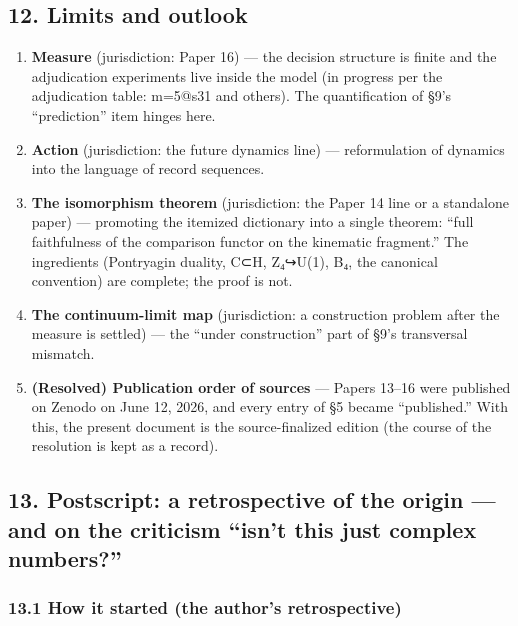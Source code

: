 \documentclass[
]{article}
\providecommand{\tightlist}{%
  \setlength{\itemsep}{0pt}\setlength{\parskip}{0pt}}
\begin{document}
\subsection{12. Limits and outlook}\label{limits-and-outlook}

\begin{enumerate}
\def\labelenumi{\arabic{enumi}.}
\tightlist
\item
  \textbf{Measure} (jurisdiction: Paper 16) --- the decision structure
  is finite and the adjudication experiments live inside the model (in
  progress per the adjudication table: m=5@s31 and others). The
  quantification of §9's ``prediction'' item hinges here.
\item
  \textbf{Action} (jurisdiction: the future dynamics line) ---
  reformulation of dynamics into the language of record sequences.
\item
  \textbf{The isomorphism theorem} (jurisdiction: the Paper 14 line or a
  standalone paper) --- promoting the itemized dictionary into a single
  theorem: ``full faithfulness of the comparison functor on the
  kinematic fragment.'' The ingredients (Pontryagin duality, C⊂H,
  Z₄↪U(1), B₄, the canonical convention) are complete; the proof is not.
\item
  \textbf{The continuum-limit map} (jurisdiction: a construction problem
  after the measure is settled) --- the ``under construction'' part of
  §9's transversal mismatch.
\item
  \textbf{(Resolved) Publication order of sources} --- Papers 13--16
  were published on Zenodo on June 12, 2026, and every entry of §5
  became ``published.'' With this, the present document is the
  source-finalized edition (the course of the resolution is kept as a
  record).
\end{enumerate}

\subsection{13. Postscript: a retrospective of the origin --- and on the
criticism ``isn't this just complex
numbers?''}\label{postscript-a-retrospective-of-the-origin-and-on-the-criticism-isnt-this-just-complex-numbers}

\subsubsection{13.1 How it started (the author's
retrospective)}\label{how-it-started-the-authors-retrospective}
\end{document}
